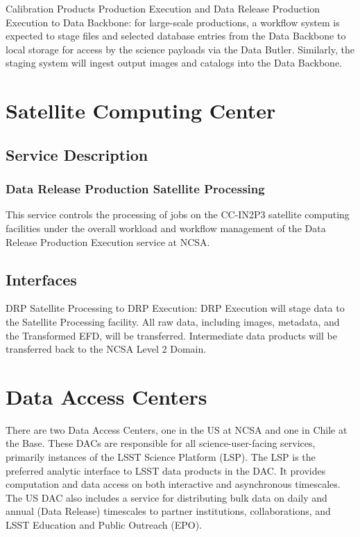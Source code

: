 \documentclass[DM,toc]{lsstdoc}
\begin{document}
Calibration Products Production Execution and Data Release Production
Execution to Data Backbone: for large-scale productions, a workflow
system is expected to stage files and selected database entries from the
Data Backbone to local storage for access by the science payloads via
the Data Butler. Similarly, the staging system will ingest output images
and catalogs into the Data Backbone.

\section{Satellite Computing Center}\label{satellite-computing-center}

\subsection{Service Description}\label{satellite-service-description}

\subsubsection{Data Release Production Satellite
Processing}\label{data-release-production-satellite-processing}

This service controls the processing of jobs on the CC-IN2P3 satellite
computing facilities under the overall workload and workflow management
of the Data Release Production Execution service at NCSA.

\subsection{Interfaces}\label{satellite-interfaces}
DRP Satellite Processing to DRP Execution: DRP Execution will stage data
to the Satellite Processing facility.  All raw data, including images,
metadata, and the Transformed EFD, will be transferred.  Intermediate
data products will be transferred back to the NCSA Level 2 Domain.


\section{Data Access Centers}\label{data-access-centers}

There are two Data Access Centers, one in the US at NCSA and one in
Chile at the Base. These DACs are responsible for all
science-user-facing services, primarily instances of the LSST Science
Platform (LSP). The LSP is the preferred analytic interface to LSST data
products in the DAC. It provides computation and data access on both
interactive and asynchronous timescales. The US DAC also includes a
service for distributing bulk data on daily and annual (Data Release)
timescales to partner institutions, collaborations, and LSST Education
and Public Outreach (EPO).
\end{document}
